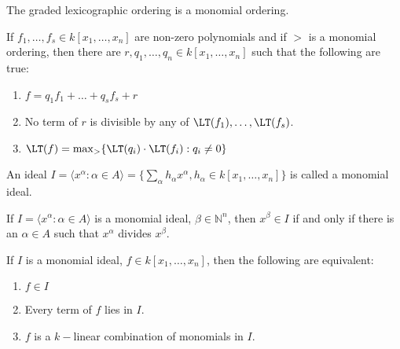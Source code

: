             \begin{theorem}
                The graded lexicographic ordering is a monomial ordering.
            \end{theorem}
            \begin{theorem}
                If $f_1,\hdots, f_s\in k[x_1,\hdots ,x_n]$ are
                non-zero polynomials and if $>$ is a monomial ordering,
                then there are $r,q_1,\hdots, q_n\in k[x_1,\hdots ,x_n]$
                such that the following are true:
                \begin{enumerate}
                    \item $f=q_{1}f_{1}+\hdots+q_{s}f_{s}+r$
                    \item No term of $r$ is divisible by
                          any of $\LT(f_{1}),\hdots,\LT(f_{s})$.
                    \item $\LT(f)=\max_{>}\{\LT(q_{i})%
                           \cdot\LT(f_i):q_i\ne{0}\}$
                \end{enumerate}
            \end{theorem}
            \begin{definition}
                An ideal
                $I=\langle{x}^{\alpha}:\alpha\in{A}\rangle%
                  =\{\sum_{\alpha}h_{\alpha}x^\alpha,h_{\alpha}%
                   \in k[x_1,\hdots ,x_n]\}$
                is called a monomial ideal.
            \end{definition}
            \begin{theorem}
                If $I=\langle{x}^\alpha:\alpha\in{A}\rangle$
                is a monomial ideal,
                $\beta\in\mathbb{N}^n$, then $x^\beta\in{I}$
                if and only if there is an $\alpha\in{A}$
                such that $x^{\alpha}$ divides $x^{\beta}$.
            \end{theorem}
            \begin{theorem}
                If $I$ is a monomial ideal,
                $f\in{k}[x_1,\hdots ,x_n]$,
                then the following are equivalent:
                \begin{enumerate}
                    \item $f\in I$
                    \item Every term of $f$ lies in $I$.
                    \item $f$ is a $k-$linear combination of
                          monomials in $I$.
                \end{enumerate}
            \end{theorem}
